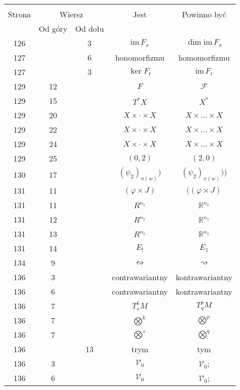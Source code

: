 \documentclass[a4paper,11pt]{article}
\newcommand{\mb}{\mathbb}
\newcommand{\mc}{\mathcal}
\newcommand{\mr}{\mathrm}
\newcommand{\ld}{\ldots}
\newcommand{\ti}{\times}
\newcommand{\im}{\mr{im}}
\newcommand{\vp}{\varphi}
\newcommand{\R}{\mb{R}}
\newcommand{\F}{\mc{F}}
\newcommand{\V}{\mc{V}}
\begin{document}
\begin{center}
  \begin{tabular}{|c|c|c|c|c|}
    \hline
    & \multicolumn{2}{c|}{} & & \\
    Strona & \multicolumn{2}{c|}{Wiersz}& Jest & Powinno być \\ \cline{2-3}
    & Od góry & Od dołu &  &  \\ \hline
    126 & & 3 & $\im \, F_{ x }$ & $\dim\im \, F_{ x }$ \\
    127 & & 6 & honomorfizmu & homomorfizmu \\
    127 & & 3 & $\ker F_{ t }$ & $\im \, F_{ t }$ \\
    129 & 12 & & $F$ & $\F$ \\
    129 & 15 & & $T^{ * }X$ & $X^{ * }$ \\
    129 & 20 & & $X \ti \cdot \ti X$ & $X \ti \ld \ti X$ \\
    129 & 22 & & $X \ti \cdot \ti X$ & $X \ti \ld \ti X$ \\
    129 & 24 & & $X \ti \cdot \ti X$ & $X \ti \ld \ti X$ \\
    129 & 25 & & $( 0, 2 )$ & $( 2, 0 )$ \\
    130 & 17 & & $( \psi_{ 2 } )_{ \pi( w ) })$
           & $( \psi_{ 2 } )_{ \pi( w ) }) \big)$ \\
    131 & 11 & & $( \vp \ti J )$ & $( ( \vp \ti J )$ \\
    131 & 11 & & $R^{ n_{ 1 } }$ & $\R^{ n_{ 1 } }$ \\
    131 & 12 & & $R^{ n_{ 1 } }$ & $\R^{ n_{ 1 } }$ \\
    131 & 13 & & $R^{ n_{ 1 } }$ & $\R^{ n_{ 1 } }$ \\
    131 & 14 & & $E_{ ! }$ & $E_{ 1 }$ \\
    134 &  9 & & $\leftrightsquigarrow$ & $\rightsquigarrow$ \\
    136 &  3 & & contrawariantny & kontrawariantny \\
    136 &  6 & & contrawariantny & kontrawariantny \\
    136 &  7 & & $T^{ k }_{ s }M$ & $T^{ p }_{ q }M$ \\
    136 &  7 & & $\bigotimes^{ k }$ & $\bigotimes^{ p }$ \\
    136 &  7 & & $\bigotimes^{ s }$ & $\bigotimes^{ q }$ \\
    136 & & 13 & trym & tym \\
    136 &  3 & & $\V_{ 0 }$ & $\V_{ 0 }$; \\
    136 &  6 & & $\V_{ 0 }$ & $\V_{ 0 }$; \\

\end{tabular}
\end{center}
\end{document}
